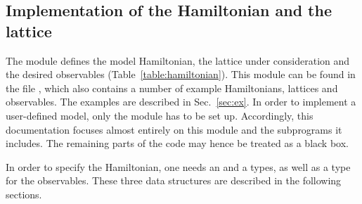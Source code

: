 
\subsection{Implementation of the Hamiltonian and the lattice} 

The module  defines the model Hamiltonian, the lattice under consideration and the desired observables (Table~\ref{table:hamiltonian}). This module can be found in the file , which also contains a number of example Hamiltonians, lattices and observables.  The examples are described in Sec.~\ref{sec:ex}.
In order to implement a user-defined model, only the module  has to be set up. Accordingly, this documentation focuses almost entirely  on this module and the subprograms it includes.
The remaining parts of the code may hence be treated as a black box.  

In order to specify the Hamiltonian, one needs  an   and a  types, as well as a type for the observables. These three data structures are described in the following sections.

